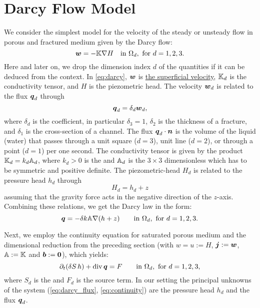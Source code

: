 
\section{Darcy Flow Model} \label{sec:darcy_flow}
We consider the simplest model for the velocity of the steady or unsteady flow in porous and fractured medium given by 
the Darcy flow:
\begin{equation}
    \label{eq:darcy}
    \vc w = -\tn K \grad H \quad\text{in }\Omega_d,\ \text{for $d=1,2,3$}.
\end{equation}
Here and later on, we drop the dimension index $d$ of the quantities if it can be deduced from the context.
In \eqref{eq:darcy}, $\mathbf{\boldsymbol{w}}$  is \href{http://en.wikipedia.org/wiki/Superficial_velocity}{the superficial velocity},
${\mathbb{K}}_d$ is the conductivity tensor, and $H$  is the piezometric head. The velocity $\mathbf{\boldsymbol{w}}_d$ is related to the flux $\mathbf{\boldsymbol{q}}_d$ 
 through
\[
    \mathbf{\boldsymbol{q}}_d = \delta_d \mathbf{\boldsymbol{w}}_d,
\]
where $\delta_d$  is the  coefficient,
in particular $\delta_3=1$, $\delta_2$  is the thickness of a fracture, and $\delta_1$  is the cross-section of a channel.
The flux $\mathbf{\boldsymbol{q}}_d\cdot\mathbf{\boldsymbol{n}}$ is the volume of the liquid (water) that passes through a unit square ($d=3$),
unit line ($d=2$), or through a point ($d=1$) per one second. 
The conductivity tensor is given by the product 
${\mathbb{K}}_d = k_d {\mathbb{A}}_d$, where $k_d>0$ 
 is the   and 
${\mathbb{A}}_d$  is the 
$3\times 3$ dimensionless  which has to be symmetric and positive definite.
The piezometric-head $H_d$ is related to the pressure head
$h_d$ through
\begin{equation}
    \label{eq:piezo_head}
    H_d = h_d + z
\end{equation}
assuming that the gravity force acts in the negative direction of the $z$-axis. 
Combining these relations, we get the Darcy law in the form:
\begin{equation}
    \label{eq:darcy_flux}
    \vc q = -\delta k\tn A \grad (h+z)  \qquad\text{in }\Omega_d,\ \text{for $d=1,2,3$}.
\end{equation}

Next, we employ the continuity equation for saturated porous medium and the dimensional reduction from the preceding section
(with $w=u:=H$, $\mathbf{\boldsymbol{j}}:=\mathbf{\boldsymbol{w}}$, ${\mathbb{A}}:={\mathbb{K}}$ and $\mathbf{\boldsymbol{b}}:=\mathbf{\boldsymbol{0}}$), which yields:
\begin{equation}
    \label{eq:continuity}
    \prtl_t (\delta S\, h) + \div \vc q = F \qquad \text{in }\Omega_d,\ \text{for $d=1,2,3$},
\end{equation}
where  $S_d$  is the  and $F_d$  is 
the source term. In our setting the principal unknowns of the system 
(\ref{eq:darcy_flux}, \ref{eq:continuity}) are the pressure head $h_d$ and the flux $\mathbf{\boldsymbol{q}}_d$.


